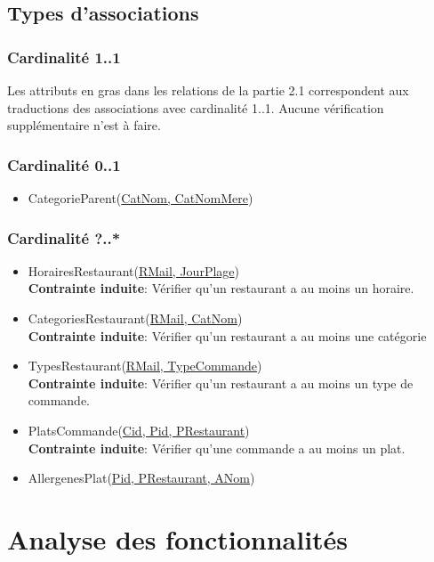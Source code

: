 \documentclass[10pt, a4paper]{article}
\begin{document}
\subsection{Types d'associations}

\subsubsection{Cardinalité 1..1}

Les attributs en gras dans les relations de la partie 2.1 correspondent aux traductions des associations avec cardinalité 1..1. 
Aucune vérification supplémentaire n'est à faire.
\subsubsection{Cardinalité 0..1}

\begin{itemize}
    \item CategorieParent\@(\underline{CatNom, CatNomMere})
\end{itemize}

\subsubsection{Cardinalité ?..*}

\begin{itemize}
    \item HorairesRestaurant\@(\underline{RMail, JourPlage})\\
    \textbf{Contrainte induite}: Vérifier qu'un restaurant a au moins un horaire.
    \item CategoriesRestaurant\@(\underline{RMail, CatNom})\\
    \textbf{Contrainte induite}: Vérifier qu'un restaurant a au moins une catégorie
    \item TypesRestaurant\@(\underline{RMail, TypeCommande})\\
    \textbf{Contrainte induite}: Vérifier qu'un restaurant a au moins un type de commande.
    \item PlatsCommande\@(\underline{Cid, Pid, PRestaurant})\\
    \textbf{Contrainte induite}: Vérifier qu'une commande a au moins un plat.
    \item AllergenesPlat\@(\underline{Pid, PRestaurant, ANom})
\end{itemize}


\section{Analyse des fonctionnalités}
\end{document}

